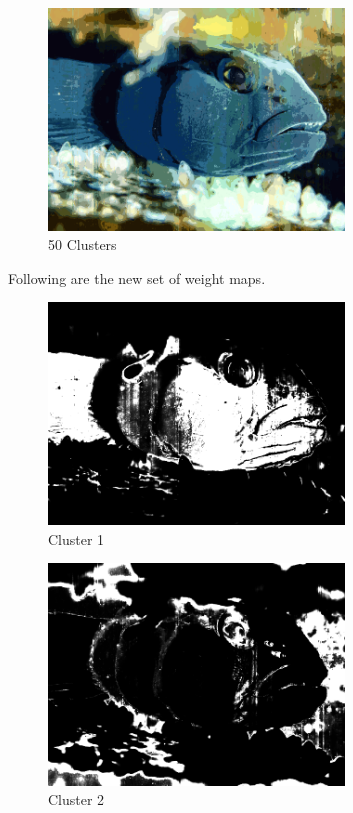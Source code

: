 \documentclass{article}      %
\begin{document}
\begin{figure}[H]
\centering
\includegraphics[width=0.7\textwidth]{partc_50_means}
\caption{50 Clusters}
\end{figure}

Following are the new set of weight maps.

\begin{figure}[H]
\centering
\includegraphics[width=0.7\textwidth]{partc_wts_cluster0}
\caption{Cluster 1}
\end{figure}

\begin{figure}[H]
\centering
\includegraphics[width=0.7\textwidth]{partc_wts_cluster1}
\caption{Cluster 2}
\end{figure}
\end{document}

